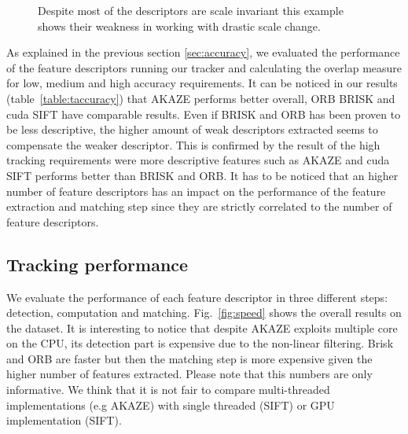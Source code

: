 \begin{figure}[t]
	\vspace{2mm}
\centerline{%
	}
	\vspace{-2mm}
\caption{Despite most of the descriptors are scale invariant this example shows their weakness in working with drastic scale change.}
\vspace{-3mm}
\label{fig:tracking_results_scale}
\end{figure}

As explained in the previous section \ref{sec:accuracy}, we evaluated the performance of the feature descriptors running our tracker and calculating the overlap measure for low, medium and high accuracy requirements. It can be noticed in our results (table~\ref{table:taccuracy}) that AKAZE performs better overall, ORB BRISK and cuda SIFT have comparable results. Even if BRISK and ORB has been proven to be less descriptive, the higher amount of weak descriptors extracted seems to compensate the weaker descriptor. This is confirmed by the result of the high tracking requirements were more descriptive features such as AKAZE and cuda SIFT performs better than BRISK and ORB. It has to be noticed that an higher number of feature descriptors has an impact on the performance of the feature extraction and matching step since they are strictly correlated to the number of feature descriptors. 

\subsection{Tracking performance}

We evaluate the performance of each feature descriptor in three different steps: detection, computation and matching. Fig.~\ref{fig:speed} shows the overall results on the dataset. It is interesting to notice that despite AKAZE exploits multiple core on the CPU, its detection part is expensive due to the non-linear filtering. Brisk and ORB are faster but then the matching step is more expensive given the higher number of features extracted. Please note that this numbers are only informative. We think that it is not fair to compare multi-threaded implementations (e.g AKAZE) with single threaded (SIFT) or GPU implementation (SIFT).

